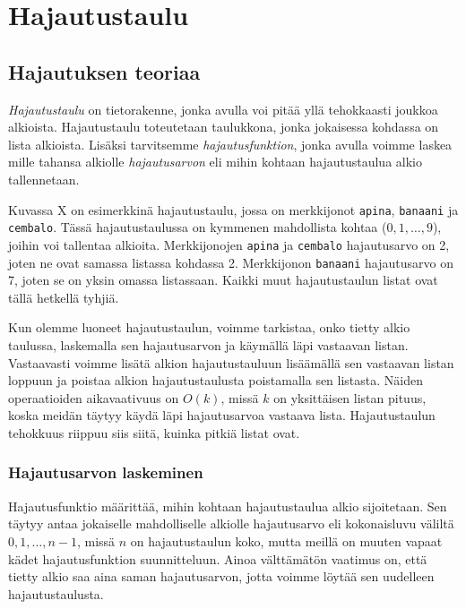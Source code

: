 \chapter{Hajautustaulu}

\section{Hajautuksen teoriaa}

\emph{Hajautustaulu} on tietorakenne, jonka avulla voi
pitää yllä tehokkaasti joukkoa alkioista.
Hajautustaulu toteutetaan taulukkona, jonka jokaisessa
kohdassa on lista alkioista.
Lisäksi tarvitsemme \emph{hajautusfunktion},
jonka avulla voimme laskea mille tahansa alkiolle
\emph{hajautusarvon} eli mihin kohtaan hajautustaulua
alkio tallennetaan.

Kuvassa X on esimerkkinä hajautustaulu, jossa on
merkkijonot \texttt{apina}, \texttt{banaani} ja \texttt{cembalo}.
Tässä hajautustaulussa on kymmenen mahdollista kohtaa
($0,1,\ldots,9$), joihin voi tallentaa alkioita.
Merkkijonojen \texttt{apina} ja \texttt{cembalo}
hajautusarvo on 2, joten ne ovat samassa listassa kohdassa 2.
Merkkijonon \texttt{banaani} hajautusarvo on 7,
joten se on yksin omassa listassaan.
Kaikki muut hajautustaulun listat ovat tällä hetkellä tyhjiä.

Kun olemme luoneet hajautustaulun, voimme tarkistaa,
onko tietty alkio taulussa, laskemalla sen hajautusarvon
ja käymällä läpi vastaavan listan.
Vastaavasti voimme lisätä alkion hajautustauluun
lisäämällä sen vastaavan listan loppuun ja poistaa
alkion hajautustaulusta poistamalla sen listasta.
Näiden operaatioiden aikavaativuus on $O(k)$,
missä $k$ on yksittäisen listan pituus,
koska meidän täytyy käydä läpi hajautusarvoa vastaava lista.
Hajautustaulun tehokkuus riippuu siis siitä,
kuinka pitkiä listat ovat.

\subsection{Hajautusarvon laskeminen}

Hajautusfunktio määrittää, mihin kohtaan hajautustaulua
alkio sijoitetaan.
Sen täytyy antaa jokaiselle mahdolliselle alkiolle
hajautusarvo eli kokonaisluvu väliltä $0,1,\ldots,n-1$,
missä $n$ on hajautustaulun koko,
mutta meillä on muuten vapaat kädet hajautusfunktion suunnitteluun.
Ainoa välttämätön vaatimus on, että tietty alkio saa aina
saman hajautusarvon, jotta voimme löytää sen uudelleen
hajautustaulusta.

